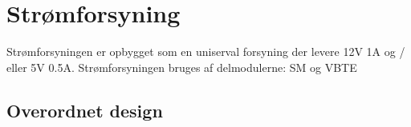 \chapter{Strømforsyning}
Strømforsyningen er opbygget som en uniserval forsyning der levere 12V 1A og / eller 5V 0.5A. Strømforsyningen bruges af delmodulerne: SM og VBTE

\section{Overordnet design}
